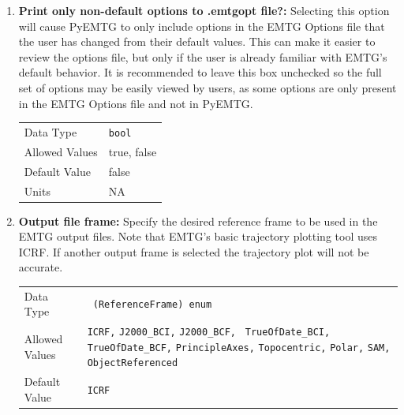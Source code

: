     \begin{enumerate}
    \item{\textbf{Print only non-default options to .emtgopt file?:}} Selecting this option will cause PyEMTG to only include options in the \ac{EMTG} Options file that the user has changed from their default values. This can make it easier to review the options file, but only if the user is already familiar with \ac{EMTG}'s default behavior. It is recommended to leave this box unchecked so the full set of options may be easily viewed by users, as some options are only present in the \ac{EMTG} Options file and not in PyEMTG.

        \begin{table}[H]
            \hspace{2cm}
            \begin{tabular}{ll}
            Data Type & \verb|bool| \\
            Allowed Values & true, false \\
            Default Value & false \\
            Units & NA
            \end{tabular}
        \end{table}

    \item{\textbf{Output file frame:}} Specify the desired reference frame to be used in the \ac{EMTG} output files. Note that \ac{EMTG}'s basic trajectory plotting tool uses \ac{ICRF}. If another output frame is selected the trajectory plot will not be accurate.
    
        \begin{table}[H]
            \hspace{2cm}
            \begin{tabular}{lp{3cm}}
            Data Type & \verb| (ReferenceFrame) enum| \\
            Allowed Values & \verb|ICRF,|\newline
            \verb|J2000_BCI,| \newline 
            \verb|J2000_BCF, |\newline
            \verb|TrueOfDate_BCI,| \newline 
            \verb|TrueOfDate_BCF,| \newline 
            \verb|PrincipleAxes,| \newline
            \verb|Topocentric,| \newline
            \verb|Polar,| \newline
            \verb|SAM,| \newline
            \verb|ObjectReferenced| \\
            Default Value & \verb|ICRF|\\
            \end{tabular}
        \end{table}


\end{enumerate}
